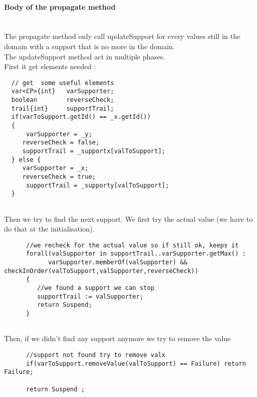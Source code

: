 \documentclass{eplDoc}
\begin{document}
\paragraph{Body of the propagate method} 
 \ \\ 
The propagate method only call updateSupport for every values still in the domain with a support that is no more in the domain.\\
The updateSupport method act in multiple phases.\\ 
First it get elements needed : 
\begin{lstlisting}
  // get  some useful elements
  var<CP>{int}   varSupporter;
  boolean        reverseCheck;
  trail{int}     supportTrail;
  if(varToSupport.getId() == _x.getId())
  { 
      varSupporter = _y;
     reverseCheck = false;
     supportTrail = _supportx[valToSupport];
  } else { 
     varSupporter = _x;
     reverseCheck = true;
      supportTrail = _supporty[valToSupport];
  }
    
\end{lstlisting}

Then we try to find the next support.  We first try the actual value (we have to do that at the initialisation).
\begin{lstlisting}
      //we recheck for the actual value so if still ok, keeps it
      forall(valSupporter in supportTrail..varSupporter.getMax() : 
            varSupporter.memberOf(valSupporter) && checkInOrder(valToSupport,valSupporter,reverseCheck))
      {
         //we found a support we can stop
         supportTrail := valSupporter;
         return Suspend;
      }  
    
\end{lstlisting}
Then, if we didn't find any support anymore we try to remove the value 
\begin{lstlisting}
      //support not found try to remove valx
      if(varToSupport.removeValue(valToSupport) == Failure) return Failure;
      
      return Suspend ;
    
\end{lstlisting}
\end{document}
